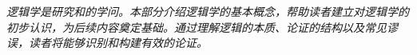 \begin{logicbox}[title=第一部分：逻辑与语言]
\textit{逻辑学是研究和的学问。本部分介绍逻辑学的基本概念，帮助读者建立对逻辑学的初步认识，为后续内容奠定基础。通过理解逻辑的本质、论证的结构以及常见谬误，读者将能够识别和构建有效的论证。}
\end{logicbox}
